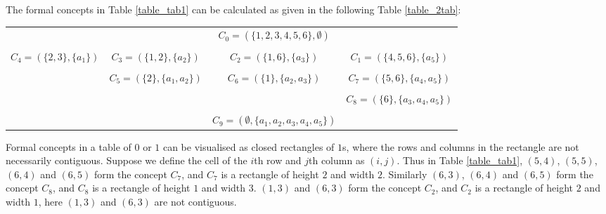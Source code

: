 \documentclass[11pt]{article}
\numberwithin{equation}{subsection}
\begin{document}
 The formal concepts in  Table \ref{table_tab1}  can be calculated as  given in the following Table \ref{table_2tab}:





 \begin{table*}[ht]
            \begin{center}
                \begin{scriptsize}
                \caption{Formal concepts in  Table 1}
                    \label{table_2tab}
                    \begin{tabular}
                        {c c c c  }
                        \hline
                             &        &  $C_0=(\{1,2,3,4,5,6\},\emptyset)$  &       \ \ \  \\

                   &    &     &        \\

 $C_4=(\{2,3\},\{a_1\}) $ & $C_3=(\{1,2\},\{a_2\}) $   & $C_2=(\{1,6\},\{a_3\}) $  &  $C_1=(\{4,5,6\},\{a_5\}) $     \\

   &    &     &         \\

  & $C_5=(\{2\},\{a_1, a_2\}) $  &  $C_6=(\{1\},\{a_2, a_3\}) $   & $C_7=(\{5,6\},\{a_4, a_5\}) $      \\

  &    &     &         \\

  &   &    &  $C_8=(\{6\},\{a_3, a_4, a_5\}) $    \\

   &    &     &         \\

 &  &    $C_9=(\emptyset,\{a_1, a_2, a_3 ,a_4, a_5\}) $   &      \\
\hline


                    \end{tabular}
                \end{scriptsize}
            \end{center}
        \end{table*}


  Formal concepts in a  table of $0$ or $1$ can be visualised as closed rectangles of $1$s, where the rows and columns in the rectangle are not necessarily contiguous.
  Suppose we define the cell of the $i$th row and $j$th column as $(i,j)$. Thus in Table \ref{table_tab1}, $(5,4)$, $(5,5)$, $(6,4)$ and $(6,5)$ form the concept $C_7$, and $C_7$ is a rectangle of height $2$ and width $2$. Similarly $(6,3)$, $(6,4)$ and $(6,5)$ form the concept $C_8$, and $C_8$ is a rectangle of height $1$ and width $3$.  $(1,3)$ and $(6,3)$ form the concept $C_2$, and $C_2$ is a rectangle of height $2$ and width $1$, here $(1,3)$ and $(6,3)$ are not contiguous.
\end{document}
